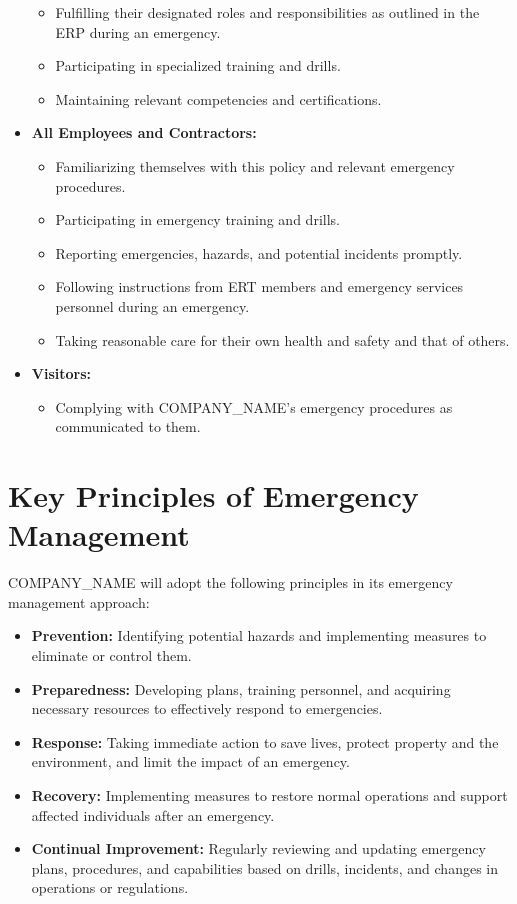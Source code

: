 \documentclass[12pt]{article}
\begin{document}
\begin{itemize}
\begin{itemize}
        \item Fulfilling their designated roles and responsibilities as outlined in the ERP during an emergency.
        \item Participating in specialized training and drills.
        \item Maintaining relevant competencies and certifications.
    \end{itemize}
    \item \textbf{All Employees and Contractors:}
    \begin{itemize}
        \item Familiarizing themselves with this policy and relevant emergency procedures.
        \item Participating in emergency training and drills.
        \item Reporting emergencies, hazards, and potential incidents promptly.
        \item Following instructions from ERT members and emergency services personnel during an emergency.
        \item Taking reasonable care for their own health and safety and that of others.
    \end{itemize}
    \item \textbf{Visitors:}
    \begin{itemize}
        \item Complying with {{COMPANY_NAME}}'s emergency procedures as communicated to them.
    \end{itemize}
\end{itemize}

\section{Key Principles of Emergency Management}
{{COMPANY_NAME}} will adopt the following principles in its emergency management approach:
\begin{itemize}
    \item \textbf{Prevention:} Identifying potential hazards and implementing measures to eliminate or control them.
    \item \textbf{Preparedness:} Developing plans, training personnel, and acquiring necessary resources to effectively respond to emergencies.
    \item \textbf{Response:} Taking immediate action to save lives, protect property and the environment, and limit the impact of an emergency.
    \item \textbf{Recovery:} Implementing measures to restore normal operations and support affected individuals after an emergency.
    \item \textbf{Continual Improvement:} Regularly reviewing and updating emergency plans, procedures, and capabilities based on drills, incidents, and changes in operations or regulations.
\end{itemize}
\end{document}
